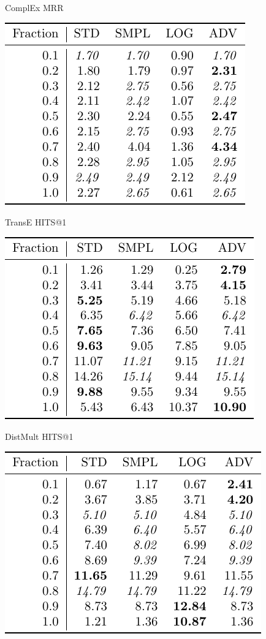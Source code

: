 \documentclass{article}
\begin{document}
\begin{figure}
\caption{ComplEx MRR}
\end{figure}\begin{figure}
\includegraphics[]{results_TransE_HITS@1}\\
\caption{TransE HITS@1}
\end{figure}\begin{figure}
\includegraphics[]{results_DistMult_HITS@1}\\
\caption{DistMult HITS@1}
\end{figure}\begin{figure}
\includegraphics[]{results_ComplEx_HITS@1}\\

\end{figure}
\end{document}

